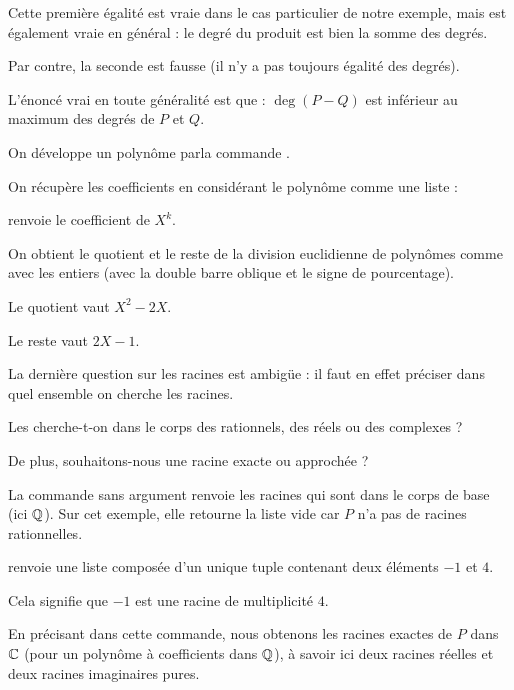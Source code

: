 \change
Cette première égalité est vraie dans le cas particulier de notre exemple, mais est également vraie en général :
le degré du produit est bien la somme des degrés.

\change
Par contre, la seconde est fausse (il n'y a pas toujours égalité des degrés).

L'énoncé vrai en toute généralité est que :
  $\deg(P - Q)$ est inférieur au maximum des degrés de $P$ et $Q$.

\change
On développe un polynôme parla commande .

\change
On récupère les coefficients en considérant le polynôme comme une liste :
  
 renvoie le coefficient de $X^k$.
  
\change
 On obtient le quotient et le reste de la division euclidienne de polynômes comme avec les entiers (avec la double barre oblique et le signe de pourcentage).
 
\change	  
 Le quotient  vaut $X^2 - 2X$. 

\change	
  Le reste  vaut $2X - 1$.
  
\change
La dernière question sur les racines est ambigüe : il faut en effet préciser dans quel ensemble on cherche les racines.
  
Les cherche-t-on dans le corps des rationnels, des réels ou des complexes ?
  
De plus, souhaitons-nous une racine exacte ou approchée ?
  
  
\change	  
 La commande  sans argument renvoie les racines qui sont dans le corps de base (ici $\mathbb{Q}$). 
  Sur cet exemple, elle retourne la liste vide car $P$ n'a pas de racines rationnelles.
  
\change	
{} renvoie une liste composée d'un unique tuple contenant deux éléments $-1$ et $4$. 

Cela signifie que 
$-1$ est une racine de multiplicité $4$.
  
\change	
En précisant  dans cette commande, nous obtenons les racines exactes de $P$ dans $\mathbb{C}$ (pour un polynôme à coefficients dans $\mathbb{Q}$), à savoir ici deux racines réelles et deux racines imaginaires pures.

